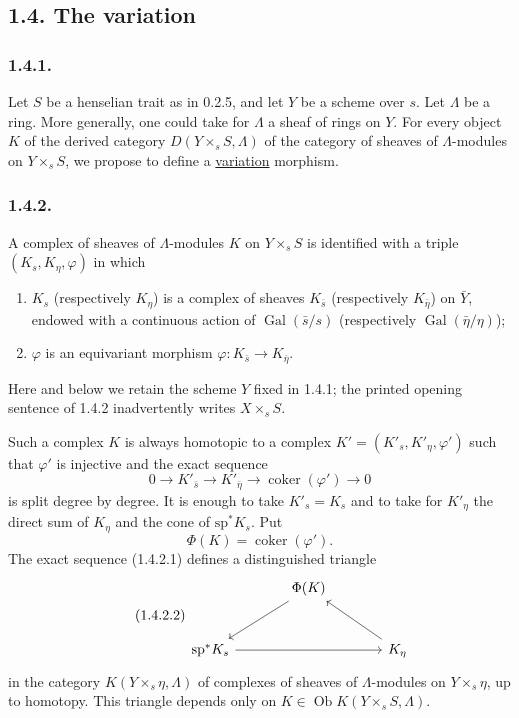 \subsection*{1.4. The variation}

\subsubsection*{1.4.1.}
Let $S$ be a henselian trait as in 0.2.5, and let $Y$ be a scheme over
$s$.  Let $\Lambda$ be a ring.  More generally, one could take for
$\Lambda$ a sheaf of rings on $Y$.  For every object $K$ of the
derived category $D(Y\times_sS,\Lambda)$ of the category of sheaves of
$\Lambda$-modules on $Y\times_sS$, we propose to define a
\underline{variation} morphism.

\subsubsection*{1.4.2.}
A complex of sheaves of $\Lambda$-modules $K$ on $Y\times_sS$ is
identified with a triple $(K_s,K_\eta,\varphi)$ in which
\begin{enumerate}[label=\alph*)]
\item $K_s$ (respectively $K_\eta$) is a complex of sheaves
$K_{\bar s}$ (respectively $K_{\bar\eta}$) on $\bar Y$, endowed with a
continuous action of $\operatorname{Gal}(\bar s/s)$ (respectively
$\operatorname{Gal}(\bar\eta/\eta)$);

\item $\varphi$ is an equivariant morphism
$\varphi:K_{\bar s}\longrightarrow K_{\bar\eta}$.
\end{enumerate}
Here and below we retain the scheme $Y$ fixed in 1.4.1; the printed
opening sentence of 1.4.2 inadvertently writes $X\times_sS$.

Such a complex $K$ is always homotopic to a complex
$K'=(K'_s,K'_\eta,\varphi')$ such that $\varphi'$ is injective and the
exact sequence
\begin{equation}\tag{1.4.2.1}
0\longrightarrow K'_{\bar s}
\longrightarrow K'_{\bar\eta}
\longrightarrow\operatorname{coker}(\varphi')
\longrightarrow0
\end{equation}
is split degree by degree.  It is enough to take $K'_s=K_s$ and to
take for $K'_\eta$ the direct sum of $K_\eta$ and the cone of
$\mathrm{sp}^*K_s$.  Put
\begin{equation*}
\Phi(K)=\operatorname{coker}(\varphi').
\end{equation*}
The exact sequence (1.4.2.1) defines a distinguished triangle
\begin{equation}\tag{1.4.2.2}
\begin{tikzcd}[column sep=large, row sep=large]
{} & \Phi(K) \arrow[dl] & {} \\
\mathrm{sp}^*K_s \arrow[rr] & {} & K_\eta \arrow[ul]
\end{tikzcd}
\end{equation}
in the category $K(Y\times_s\eta,\Lambda)$ of complexes of sheaves of
$\Lambda$-modules on $Y\times_s\eta$, up to homotopy.  This triangle
depends only on $K\in\operatorname{Ob}K(Y\times_sS,\Lambda)$.

